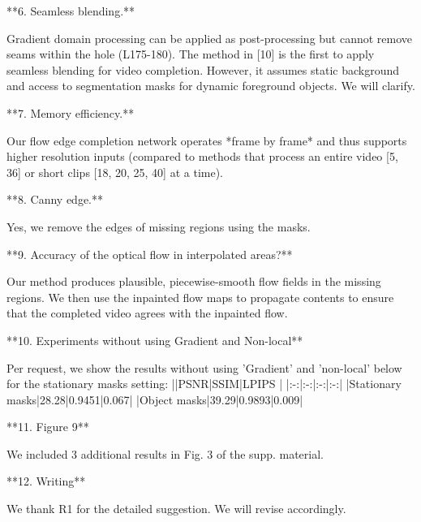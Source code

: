 \documentclass[runningheads]{llncs}
\begin{document}
**6. Seamless blending.**

Gradient domain processing can be applied as post-processing but cannot remove seams within the hole (L175-180).
The method in [10] is the first to apply seamless blending for video completion. 
However, it assumes static background and access to segmentation masks for dynamic foreground objects.
We will clarify.








**7. Memory efficiency.**

Our flow edge completion network operates *frame by frame* and thus supports higher resolution inputs (compared to methods that process an entire video [5, 36] or short clips [18, 20, 25, 40] at a time).









**8. Canny edge.**

Yes, we remove the edges of missing regions using the masks.



**9. Accuracy of the optical flow in interpolated areas?**

Our method produces plausible, piecewise-smooth flow fields in the missing regions.
We then use the inpainted flow maps to propagate contents to ensure that the completed video agrees with the inpainted flow.




**10. Experiments without using Gradient and Non-local**

Per request, we show the results without using 'Gradient' and 'non-local' below for the stationary masks setting:
||PSNR|SSIM|LPIPS |
|:-:|:-:|:-:|:-:|
|Stationary masks|28.28|0.9451|0.067|
|Object masks|39.29|0.9893|0.009|















**11. Figure 9**

We included 3 additional results in Fig. 3 of the supp. material.



**12. Writing**

We thank R1 for the detailed suggestion.
We will revise accordingly.
\end{document}
